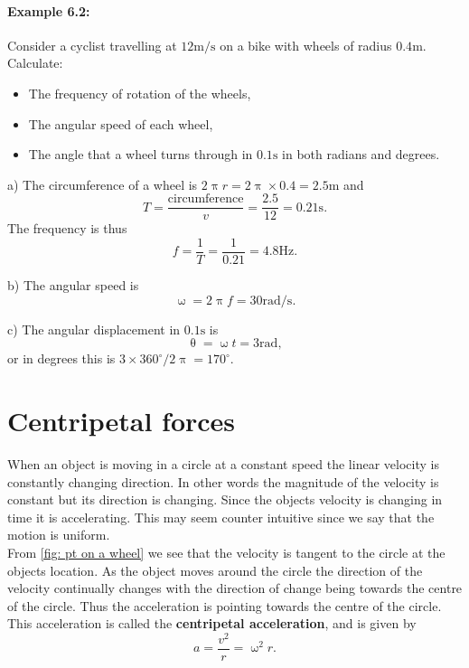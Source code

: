 \paragraph{Example 6.2:} Consider a cyclist travelling at $ 12\text{m/s}$ on a bike with wheels of radius $0.4\text{m}$. Calculate:
\begin{itemize}
\setlength{\itemsep}{-5pt}
    \item[a)] The frequency of rotation of the wheels,
    \item[b)] The angular speed of each wheel,
    \item[c)] The angle that a wheel turns through in $0.1\text{s}$ in both radians and degrees.
\end{itemize} 

a) The circumference of a wheel is $2\uppi r=2\uppi\times 0.4 =2.5\text{m}$ and 
\begin{equation*}
T=\frac{\text{circumference}}{v}=\frac{2.5}{12}=0.21\text{s}.
\end{equation*}
The frequency is thus
\begin{equation*}
f=\frac{1}{T}=\frac{1}{0.21}=4.8\text{Hz}.
\end{equation*}

b) The angular speed is 
\begin{equation*}
\upomega=2\uppi f=30\text{rad/s}.
\end{equation*}

c) The angular displacement in $0.1\text{s}$ is
\begin{equation*}
\uptheta=\upomega t=3 \text{rad},
\end{equation*}
or in degrees this is $3\times360^{\circ}/2\uppi=170^{\circ}$.

\section{Centripetal forces}
When an object is moving in a circle at a constant speed the linear velocity is constantly changing direction. In other words the magnitude of the velocity is constant but its direction is changing. Since the objects velocity is changing in time it is accelerating. This may seem counter intuitive since we say that the motion is uniform. \\

From \cref{fig: pt on a wheel}  we see that the velocity is tangent to the circle at the objects location. As the object moves around the circle the direction of the velocity continually changes with the direction of change being towards the centre of the circle. Thus the acceleration is pointing towards the centre of the circle. This acceleration is called the \textbf{centripetal acceleration}, and is given by
\begin{equation}
a=\frac{v^{2}}{r}=\upomega^{2}r.
\label{eq: centripetal acceleration}
\end{equation}


